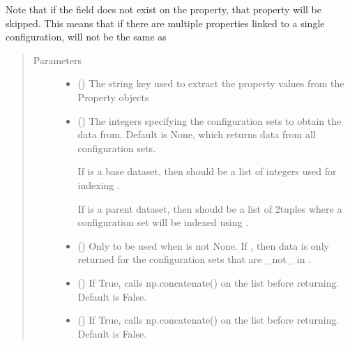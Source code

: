 \documentclass[letterpaper,10pt,english]{sphinxmanual}
\begin{document}
\begin{fulllineitems}
\begin{fulllineitems}
\sphinxAtStartPar
Note that if the field does not exist on the property, that property
will be skipped. This means that if there are multiple properties linked
to a single configuration,  will not be the same as
\begin{quote}\begin{description}
\item[{Parameters}] \leavevmode\begin{itemize}
\item {} 
\sphinxAtStartPar
{} () \textendash{} The string key used to extract the property values from the
Property objects

\item {} 
\sphinxAtStartPar
{} () \textendash{} 
\sphinxAtStartPar
The integers specifying the configuration sets to obtain the
data from. Default is None, which returns data from all
configuration sets.

\sphinxAtStartPar
If  is a base dataset, then  should be a list of
integers used for indexing .

\sphinxAtStartPar
If  is a parent dataset, then  should be a list of
2\sphinxhyphen{}tuples  where a configuration set will be indexed
using .


\item {} 
\sphinxAtStartPar
{} () \textendash{} Only to be used when  is not None. If ,
then data is only returned for the configuration sets that are
\_not\_ in .

\item {} 
\sphinxAtStartPar
{} () \textendash{} If True, calls np.concatenate() on the list before returning.
Default is False.

\item {} 
\sphinxAtStartPar
{} () \textendash{} If True, calls np.concatenate() on the list before returning.
Default is False.


\end{itemize}
\end{description}
\end{quote}
\end{fulllineitems}
\end{fulllineitems}
\end{document}
